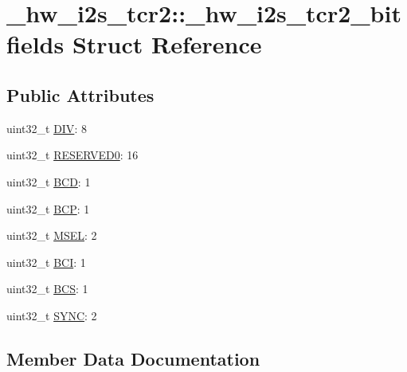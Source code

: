 \hypertarget{struct__hw__i2s__tcr2_1_1__hw__i2s__tcr2__bitfields}{}\section{\+\_\+hw\+\_\+i2s\+\_\+tcr2\+:\+:\+\_\+hw\+\_\+i2s\+\_\+tcr2\+\_\+bitfields Struct Reference}
\label{struct__hw__i2s__tcr2_1_1__hw__i2s__tcr2__bitfields}
\subsection*{Public Attributes}
\begin{DoxyCompactItemize}
\item 
uint32\+\_\+t \hyperlink{struct__hw__i2s__tcr2_1_1__hw__i2s__tcr2__bitfields_acbbb700bf0467f4756005d1d26a0d168}{D\+IV}\+: 8
\item 
uint32\+\_\+t \hyperlink{struct__hw__i2s__tcr2_1_1__hw__i2s__tcr2__bitfields_a9edd2530a69c0575c3d2fcf347a65187}{R\+E\+S\+E\+R\+V\+E\+D0}\+: 16
\item 
uint32\+\_\+t \hyperlink{struct__hw__i2s__tcr2_1_1__hw__i2s__tcr2__bitfields_a7e339723be5834d1714a14519df34e4c}{B\+CD}\+: 1
\item 
uint32\+\_\+t \hyperlink{struct__hw__i2s__tcr2_1_1__hw__i2s__tcr2__bitfields_a41ddfdb9d26146367a291d5593eaaacb}{B\+CP}\+: 1
\item 
uint32\+\_\+t \hyperlink{struct__hw__i2s__tcr2_1_1__hw__i2s__tcr2__bitfields_a0db307dd682d3bdc3d804cb24455ac4e}{M\+S\+EL}\+: 2
\item 
uint32\+\_\+t \hyperlink{struct__hw__i2s__tcr2_1_1__hw__i2s__tcr2__bitfields_ae2ce380d70778cfabaf912ddc893aa7e}{B\+CI}\+: 1
\item 
uint32\+\_\+t \hyperlink{struct__hw__i2s__tcr2_1_1__hw__i2s__tcr2__bitfields_a7258bd5815f0f3d692fa4fb0d47a751b}{B\+CS}\+: 1
\item 
uint32\+\_\+t \hyperlink{struct__hw__i2s__tcr2_1_1__hw__i2s__tcr2__bitfields_af6299db3234d56355a233383942d128f}{S\+Y\+NC}\+: 2
\end{DoxyCompactItemize}


\subsection{Member Data Documentation}
